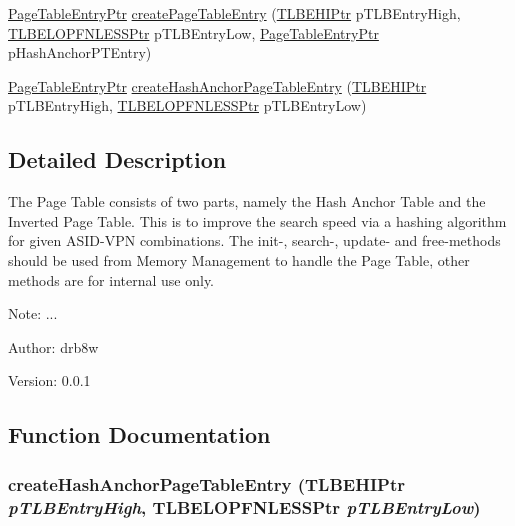 \begin{CompactItemize}
\item 
\hyperlink{struct_page_table_entry}{PageTableEntryPtr} \hyperlink{group___v_m_m___p_t_g5002efe2fb3da2510b62affe18807174}{createPageTableEntry} (\hyperlink{struct_t_l_b_e_h_i}{TLBEHIPtr} pTLBEntryHigh, \hyperlink{struct_t_l_b_e_l_o_p_f_n_l_e_s_s}{TLBELOPFNLESSPtr} pTLBEntryLow, \hyperlink{struct_page_table_entry}{PageTableEntryPtr} pHashAnchorPTEntry)
\item 
\hyperlink{struct_page_table_entry}{PageTableEntryPtr} \hyperlink{group___v_m_m___p_t_g993bcff0f6138305b034e3b09e69cf8d}{createHashAnchorPageTableEntry} (\hyperlink{struct_t_l_b_e_h_i}{TLBEHIPtr} pTLBEntryHigh, \hyperlink{struct_t_l_b_e_l_o_p_f_n_l_e_s_s}{TLBELOPFNLESSPtr} pTLBEntryLow)
\end{CompactItemize}


\subsection{Detailed Description}
The Page Table consists of two parts, namely the Hash Anchor Table and the Inverted Page Table. This is to improve the search speed via a hashing algorithm for given ASID-VPN combinations. The init-, search-, update- and free-methods should be used from Memory Management to handle the Page Table, other methods are for internal use only. 

\begin{Desc}
\item[Note:]... \end{Desc}
\begin{Desc}
\item[Author:]drb8w \end{Desc}
\begin{Desc}
\item[Version:]0.0.1 \end{Desc}


\subsection{Function Documentation}
\hypertarget{group___v_m_m___p_t_g993bcff0f6138305b034e3b09e69cf8d}{
\subsubsection[{createHashAnchorPageTableEntry}]{ createHashAnchorPageTableEntry ({\bf TLBEHIPtr} {\em pTLBEntryHigh}, \/  {\bf TLBELOPFNLESSPtr} {\em pTLBEntryLow})}}
\label{group___v_m_m___p_t_g993bcff0f6138305b034e3b09e69cf8d}


